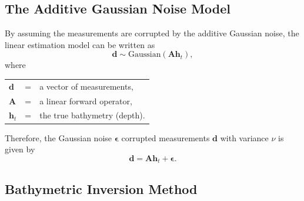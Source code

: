 \subsection{The Additive Gaussian Noise Model}
By assuming the measurements are corrupted by the additive Gaussian noise, the linear estimation model can be written as 
\begin{equation}
\mathbf{d} \sim \text{Gaussian}( \mathbf{A} \mathbf{h}_t),
\end{equation}
\vspace{0.3cm}
where\\
\begin{tabular}{l c l}
$\mathbf{d}$ &=& a vector of measurements,\\
$\mathbf{A}$ &=& a linear forward operator,\\
$\mathbf{h}_t$ &=& the true bathymetry (depth). 
\end{tabular}

\vspace{0.3cm}
\noindent Therefore, the Gaussian noise $\boldsymbol{\epsilon}$ corrupted measurements $\mathbf{d}$ with variance $\nu$ is given by 
$$
\mathbf{d} = \mathbf{A} \mathbf{h}_t + \boldsymbol{\epsilon}.
$$



\subsection{Bathymetric Inversion Method}

